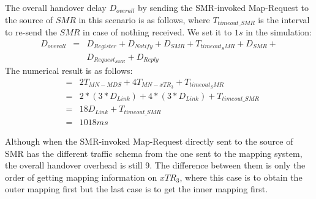 The overall handover delay $D_{overall}$ by sending the SMR-invoked Map-Request to the source of $SMR$ in this scenario is as follows, where $T_{timeout\_SMR}$ is the interval to re-send the $SMR$ in case of nothing received. We set it to $1 s$ in the simulation:
\begin{eqnarray}
D_{overall} &=& D_{Register} + D_{Notify} + D_{SMR} + T_{timeout_SMR} + D_{SMR} +  \nonumber \\
& & D_{Request_{SMR}} + D_{Reply}
\end{eqnarray}
The numerical result is as follows:
\begin{eqnarray}
&=& 2T_{MN-MDS} + 4T_{MN-xTR_3} + T_{timeout_SMR}\nonumber \\
&=& 2* (3*D_{Link}) + 4*(3*D_{Link}) + T_{timeout\_SMR} \nonumber \\
&=& 18D_{Link} + T_{timeout\_SMR}   \nonumber \\
&=& 1018 ms \nonumber
\end{eqnarray}

Although when the SMR-invoked Map-Request directly sent to the source of SMR has the different traffic schema from the one sent to the mapping system, the overall handover overhead is still 9. The difference between them is only the order of getting mapping information on $xTR_3$, where this case is to obtain the outer mapping first but the last case is to get the inner mapping first.

